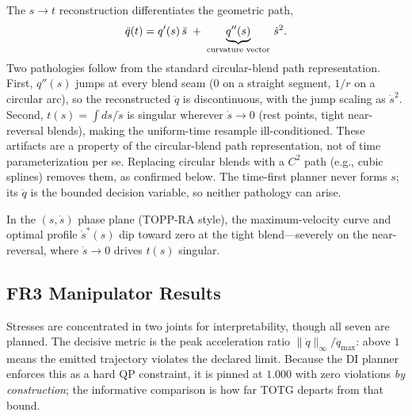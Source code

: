 The \(s\!\to\!t\) reconstruction differentiates the geometric path,
\[\eqfit{\ddot q(t) = q'(s)\,\ddot s \;+\; \underbrace{q''(s)}_{\text{curvature vector}}\,\dot s^2 .}\]
Two pathologies follow from the standard circular-blend path
representation. First, \(q''(s)\) jumps at every blend seam (\(0\) on a
straight segment, \(1/r\) on a circular arc), so the reconstructed
\(\ddot q\) is discontinuous, with the jump scaling as \(\dot s^2\).
Second, \(t(s)=\int ds/\dot s\) is singular wherever \(\dot s \to 0\)
(rest points, tight near-reversal blends), making the uniform-time
resample ill-conditioned. These artifacts are a property of the
circular-blend path representation, not of time parameterization per se.
Replacing circular blends with a \(C^2\) path (e.g., cubic splines)
removes them, as confirmed below. The time-first planner never forms
\(s\); its \(\ddot q\) is the bounded decision variable, so neither
pathology can arise.

In the \((s,\dot s)\) phase plane (TOPP-RA style), the maximum-velocity
curve and optimal profile \(\dot s^*(s)\) dip toward zero at the tight
blend---severely on the near-reversal, where \(\dot s\to0\) drives
\(t(s)\) singular.

\subsection{FR3 Manipulator
Results}\label{b.-fr3-manipulator-results}

Stresses are concentrated in two joints for interpretability, though all
seven are planned. The decisive metric is the peak acceleration ratio
\(\lVert\ddot q\rVert_\infty/\ddot q_{\max}\): above \(1\) means the
emitted trajectory violates the declared limit. Because the DI planner
enforces this as a hard QP constraint, it is pinned at \(1.000\) with
zero violations \emph{by construction}; the informative comparison is how
far TOTG departs from that bound.

